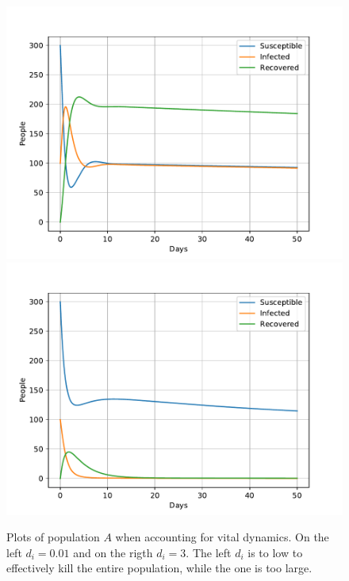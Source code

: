 \documentclass[a4paper]{article}
\begin{document}
\begin{figure}[!htb]
	\centering 
	\includegraphics[scale=0.56]{../plots/opp_c_k3.pdf} %
	\includegraphics[scale=0.56]{../plots/opp_c_k0.pdf}
	\caption{Plots of population $A$ when accounting for vital dynamics. On the left $d_i=0.01$ and on the rigth $d_i=3$. The left $d_i$ is to low to effectively kill the entire population, while the one is too large.}

\end{figure}
\end{document}
